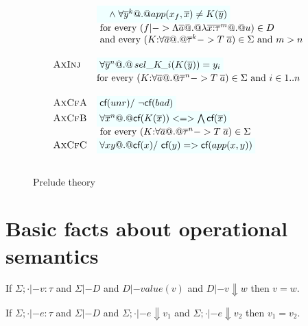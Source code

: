 \documentclass[preprint,nocopyrightspace]{sigplanconf}
\begin{document}
\begin{figure}
\[\begin{array}{c}
\begin{array}{lll}
                  & \formula{\quad\land\; \forall \oln{y}{k} @.@ app(x_f,\xs) \neq K(\ol{y})} \\
                  & \text{ for every } (f |-> \Lambda\as @.@ \lambda\oln{x{:}\tau}{m} @.@ u) \in D  \\
                  & \text{ and every } (K{:}\forall\as @.@ \oln{\tau}{k} -> T\;\as) \in \Sigma \text{ and } m > n  \\ \\ 
 \textsc{AxInj}   & \formula{\forall \oln{y}{n} @.@ \sel{K}{i}(K(\ys)) = y_i} \\ 
                  & \text{for every } (K{:}\forall\as @.@ \oln{\tau}{n} -> T\;\as) \in \Sigma \text{ and } i \in 1..n \\ \\
 \textsc{AxCfA}   & \formula{\lcf{\unr} /\ \lncf{\bad}} \\
 \textsc{AxCfB}   & \formula{\forall \oln{x}{n} @.@ \lcf{K(\ol{x})} <=> \bigwedge\lcf{\ol{x}}} \\
                  & \text{ for every } (K{:}\forall\as @.@ \oln{\tau}{n} -> T\;\as) \in \Sigma \\
 \textsc{AxCfC}   & \formula{\forall x y @.@ \lcf{x} /\ \lcf{y} => \lcf{app(x,y)}} \\ \\ 
\end{array}
\end{array}\]
\caption{Prelude theory}\label{fig:prelude}
\end{figure}

\section{Basic facts about operational semantics}
\newcommand{\roll}{\mathsf{roll}}
\newcommand{\unroll}{\mathsf{unroll}}
\newcommand{\bind}{\mathsf{bind}}
\newcommand{\ret}{\mathsf{ret}}
\newcommand{\dlambda}{\mathsf{\lambda}}
\newcommand{\curry}{\mathsf{curry}}
\newcommand{\eval}{\mathsf{eval}}
\newcommand{\uncurry}{\mathsf{incurry}}
\newcommand{\dapp}{\mathsf{app}}
\newcommand{\inj}[1]{\mathsf{inj}_{#1}}

\begin{lemma}
If $\Sigma;\cdot |- v : \tau$ and 
$\Sigma |- D$ and $D |- value(v)$ and $D |- v \Downarrow w$ then $ v = w $.
\end{lemma}

\begin{lemma}
If $\Sigma;\cdot |- e : \tau$ and 
$\Sigma |- D$ and $\Sigma;\cdot |- e \Downarrow v_1$ and $\Sigma;\cdot |- e \Downarrow v_2$ then
$v_1 = v_2$.
\end{lemma}
\end{document}
